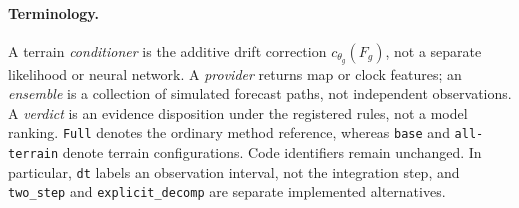 \paragraph{Terminology.}
A terrain \emph{conditioner} is the additive drift correction
\(c_{\theta_g}(F_g)\), not a separate likelihood or neural network.
A \emph{provider} returns map or clock features; an \emph{ensemble} is a
collection of simulated forecast paths, not independent observations.
A \emph{verdict} is an evidence disposition under the registered rules,
not a model ranking. \texttt{Full} denotes the ordinary method reference,
whereas \texttt{base} and \texttt{all-terrain} denote terrain configurations.
Code identifiers remain unchanged. In particular, \texttt{dt} labels an
observation interval, not the integration step, and \texttt{two\_step} and
\texttt{explicit\_decomp} are separate implemented alternatives.
